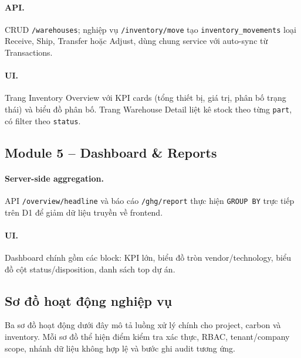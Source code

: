 \paragraph{API.} CRUD \texttt{/warehouses}; nghiệp vụ \texttt{/inventory/move} tạo \texttt{inventory\_movements} loại Receive, Ship, Transfer hoặc Adjust, dùng chung service với auto-sync từ Transactions.

\paragraph{UI.} Trang Inventory Overview với KPI cards (tổng thiết bị, giá trị, phân bố trạng thái) và biểu đồ phân bố. Trang Warehouse Detail liệt kê stock theo từng \texttt{part}, có filter theo \texttt{status}.

\subsection{Module 5 -- Dashboard \& Reports}
\paragraph{Server-side aggregation.} API \texttt{/overview/headline} và báo cáo \texttt{/ghg/report} thực hiện \texttt{GROUP BY} trực tiếp trên D1 để giảm dữ liệu truyền về frontend.

\paragraph{UI.} Dashboard chính gồm các block: KPI lớn, biểu đồ tròn vendor/technology, biểu đồ cột status/disposition, danh sách top dự án.

\subsection{Sơ đồ hoạt động nghiệp vụ}
Ba sơ đồ hoạt động dưới đây mô tả luồng xử lý chính cho project, carbon và inventory. Mỗi sơ đồ thể hiện điểm kiểm tra xác thực, RBAC, tenant/company scope, nhánh dữ liệu không hợp lệ và bước ghi audit tương ứng.





